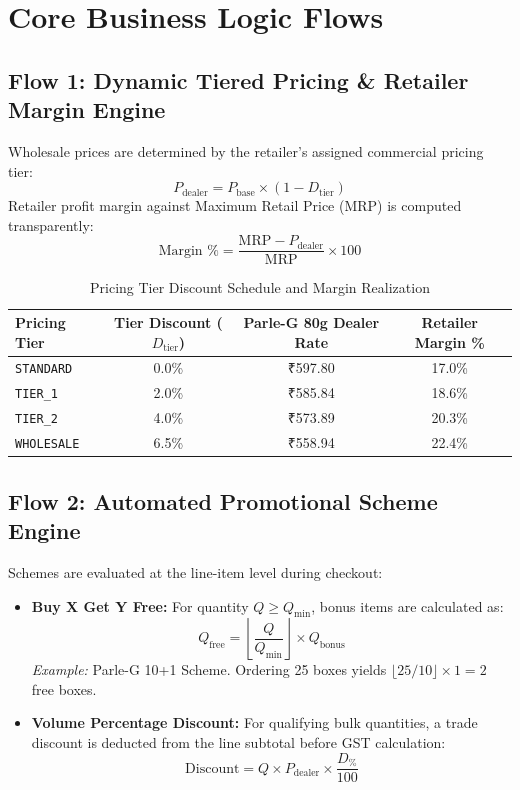 \documentclass[11pt,a4paper]{article}
\begin{document}
\section{Core Business Logic Flows}

\subsection{Flow 1: Dynamic Tiered Pricing \& Retailer Margin Engine}
Wholesale prices are determined by the retailer's assigned commercial pricing tier:
\begin{equation}
    P_{\text{dealer}} = P_{\text{base}} \times (1 - D_{\text{tier}})
\end{equation}
Retailer profit margin against Maximum Retail Price (MRP) is computed transparently:
\begin{equation}
    \text{Margin \%} = \frac{\text{MRP} - P_{\text{dealer}}}{\text{MRP}} \times 100
\end{equation}

\begin{table}[h!]
\centering
\small
\begin{tabular}{l c c c}
\toprule
\textbf{Pricing Tier} & \textbf{Tier Discount ($D_{\text{tier}}$)} & \textbf{Parle-G 80g Dealer Rate} & \textbf{Retailer Margin \%} \\
\midrule
\texttt{STANDARD} & 0.0\% & ₹597.80 & 17.0\% \\
\texttt{TIER\_1} & 2.0\% & ₹585.84 & 18.6\% \\
\texttt{TIER\_2} & 4.0\% & ₹573.89 & 20.3\% \\
\texttt{WHOLESALE} & 6.5\% & ₹558.94 & 22.4\% \\
\bottomrule
\end{tabular}
\caption{Pricing Tier Discount Schedule and Margin Realization}
\end{table}

\subsection{Flow 2: Automated Promotional Scheme Engine}
Schemes are evaluated at the line-item level during checkout:
\begin{itemize}[leftmargin=1.5cm]
    \item \textbf{Buy X Get Y Free:} For quantity $Q \ge Q_{\min}$, bonus items are calculated as:
    \begin{equation}
        Q_{\text{free}} = \left\lfloor \frac{Q}{Q_{\min}} \right\rfloor \times Q_{\text{bonus}}
    \end{equation}
    \textit{Example:} Parle-G 10+1 Scheme. Ordering 25 boxes yields $\lfloor 25/10 \rfloor \times 1 = 2$ free boxes.
    \item \textbf{Volume Percentage Discount:} For qualifying bulk quantities, a trade discount is deducted from the line subtotal before GST calculation:
    \begin{equation}
        \text{Discount} = Q \times P_{\text{dealer}} \times \frac{D_{\%}}{100}
    \end{equation}
\end{itemize}
\end{document}

